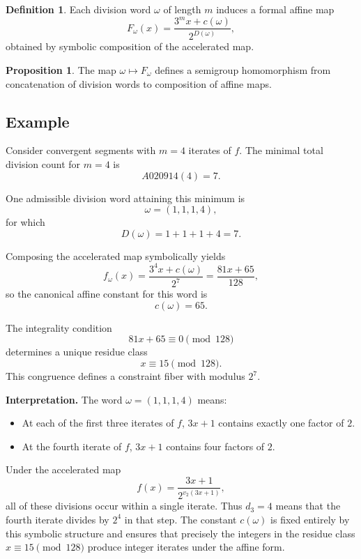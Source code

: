 \documentclass[12pt, oneside]{article}
\numberwithin{equation}{section}
\theoremstyle{definition}
\newtheorem{definition}{Definition}[section]
\newtheorem{proposition}{Proposition}[section]
\theoremstyle{plain}
\theoremstyle{remark}
\begin{document}
\begin{definition}
Each division word $\omega$ of length $m$ induces a formal affine map
\[
F_\omega(x) = \frac{3^m x + c(\omega)}{2^{D(\omega)}},
\]
obtained by symbolic composition of the accelerated map.
\end{definition}

\begin{proposition}
The map $\omega \mapsto F_\omega$ defines a semigroup homomorphism
from concatenation of division words to composition of affine maps.
\end{proposition}

\subsection{Example}

Consider convergent segments with $m=4$ iterates of $f$.  
The minimal total division count for $m=4$ is
\[
A020914(4) = 7.
\]

One admissible division word attaining this minimum is
\[
\omega = (1,1,1,4),
\]
for which
\[
D(\omega) = 1+1+1+4 = 7.
\]

Composing the accelerated map symbolically yields
\[
f_\omega(x)=\frac{3^4 x + c(\omega)}{2^7}
           = \frac{81x + 65}{128},
\]
so the canonical affine constant for this word is
\[
c(\omega)=65.
\]

The integrality condition
\[
81x + 65 \equiv 0 \pmod{128}
\]
determines a unique residue class
\[
x \equiv 15 \pmod{128}.
\]
This congruence defines a constraint fiber with modulus $2^7$.

\medskip

\noindent
\textbf{Interpretation.}
The word $\omega = (1,1,1,4)$ means:

\begin{itemize}
    \item At each of the first three iterates of $f$, $3x+1$ contains exactly one factor of $2$.
    \item At the fourth iterate of $f$, $3x+1$ contains four factors of $2$.
\end{itemize}

Under the accelerated map
\[
f(x)=\frac{3x+1}{2^{v_2(3x+1)}},
\]
all of these divisions occur within a single iterate. Thus $d_3=4$ means that
the fourth iterate divides by $2^4$ in that step. The constant $c(\omega)$ is
fixed entirely by this symbolic structure and ensures that precisely the
integers in the residue class $x \equiv 15 \pmod{128}$ produce integer iterates
under the affine form.
\end{document}
